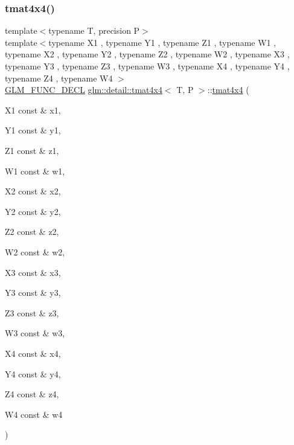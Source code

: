\subsubsection{\texorpdfstring{tmat4x4()}{tmat4x4()}\hspace{0.1cm}{\footnotesize\ttfamily [8/22]}}
{\footnotesize\ttfamily template$<$typename T, precision P$>$ \\
template$<$typename X1 , typename Y1 , typename Z1 , typename W1 , typename X2 , typename Y2 , typename Z2 , typename W2 , typename X3 , typename Y3 , typename Z3 , typename W3 , typename X4 , typename Y4 , typename Z4 , typename W4 $>$ \\
\hyperlink{setup_8hpp_ab2d052de21a70539923e9bcbf6e83a51}{G\+L\+M\+\_\+\+F\+U\+N\+C\+\_\+\+D\+E\+CL} \hyperlink{structglm_1_1detail_1_1tmat4x4}{glm\+::detail\+::tmat4x4}$<$ T, P $>$\+::\hyperlink{structglm_1_1detail_1_1tmat4x4}{tmat4x4} (\begin{DoxyParamCaption}\item[{X1 const \&}]{x1,  }\item[{Y1 const \&}]{y1,  }\item[{Z1 const \&}]{z1,  }\item[{W1 const \&}]{w1,  }\item[{X2 const \&}]{x2,  }\item[{Y2 const \&}]{y2,  }\item[{Z2 const \&}]{z2,  }\item[{W2 const \&}]{w2,  }\item[{X3 const \&}]{x3,  }\item[{Y3 const \&}]{y3,  }\item[{Z3 const \&}]{z3,  }\item[{W3 const \&}]{w3,  }\item[{X4 const \&}]{x4,  }\item[{Y4 const \&}]{y4,  }\item[{Z4 const \&}]{z4,  }\item[{W4 const \&}]{w4 }\end{DoxyParamCaption})}

\mbox{\label{structglm_1_1detail_1_1tmat4x4_a1d5edd29def5b7c600505373f7dab5a2}} 
